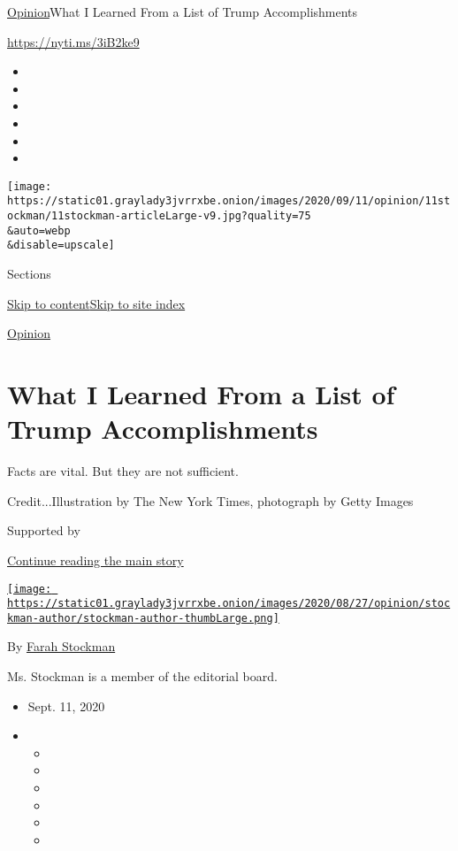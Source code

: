 \href{/section/opinion}{Opinion}\textbar{}What I Learned From a List of
Trump Accomplishments

\url{https://nyti.ms/3iB2ke9}

\begin{itemize}
\item
\item
\item
\item
\item
\item
\end{itemize}

\texttt{[image: https://static01.graylady3jvrrxbe.onion/images/2020/09/11/opinion/11stockman/11stockman-articleLarge-v9.jpg?quality=75\\\&auto=webp\\\&disable=upscale]}

Sections

\protect\hyperlink{site-content}{Skip to
content}\protect\hyperlink{site-index}{Skip to site index}

\href{/section/opinion}{Opinion}

\hypertarget{what-i-learned-from-a-list-of-trump-accomplishments}{%
\section{What I Learned From a List of Trump
Accomplishments}\label{what-i-learned-from-a-list-of-trump-accomplishments}}

Facts are vital. But they are not sufficient.

Credit...Illustration by The New York Times, photograph by Getty Images

Supported by

\protect\hyperlink{after-sponsor}{Continue reading the main story}

\href{https://www.nytimes3xbfgragh.onion/by/farah-stockman}{\texttt{[image: https://static01.graylady3jvrrxbe.onion/images/2020/08/27/opinion/stockman-author/stockman-author-thumbLarge.png]}}

By \href{https://www.nytimes3xbfgragh.onion/by/farah-stockman}{Farah
Stockman}

Ms. Stockman is a member of the editorial board.

\begin{itemize}
\item
  Sept. 11, 2020
\item
  \begin{itemize}
  \item
  \item
  \item
  \item
  \item
  \item
  \end{itemize}
\end{itemize}

